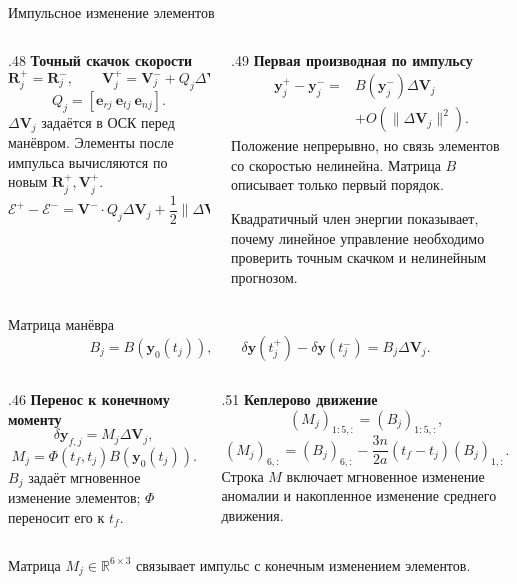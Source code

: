 \documentclass[11pt,aspectratio=169,t]{beamer}
\newcommand{\eqcompact}{\fontsize{10}{12}\selectfont}
\newcommand{\derivationmathspacing}{%
  \setlength{\abovedisplayskip}{2pt}%
  \setlength{\belowdisplayskip}{3pt}%
  \setlength{\abovedisplayshortskip}{2pt}%
  \setlength{\belowdisplayshortskip}{2pt}%
  \setlength{\jot}{2pt}}
\newcommand{\vect}[1]{\boldsymbol{#1}}
\begin{document}
\begin{frame}{Импульсное изменение элементов}
\relax
\derivationmathspacing
\begin{columns}[T,onlytextwidth]
\begin{column}{.48\textwidth}
\textbf{Точный скачок скорости}
{\eqcompact\derivationmathspacing
\[
 \vect R_j^+=\vect R_j^-,\qquad
 \vect V_j^+=\vect V_j^-+Q_j\Delta\vect V_j,
\]
\[
 Q_j=[\vect e_{rj}\ \vect e_{tj}\ \vect e_{nj}].
\]
}
$\Delta\vect V_j$ задаётся в ОСК перед манёвром. Элементы после импульса вычисляются по новым $\vect R_j^+,\vect V_j^+$.
{\eqcompact\derivationmathspacing
\[
 \mathcal E^+-\mathcal E^-
 =\vect V^-\cdot Q_j\Delta\vect V_j
       +\frac12\|\Delta\vect V_j\|^2.
\]
}
\end{column}
\begin{column}{.49\textwidth}
\textbf{Первая производная по импульсу}
{\eqcompact\derivationmathspacing
\[
 \begin{aligned}
 \vect y_j^+-\vect y_j^-={}&B(\vect y_j^-)\Delta\vect V_j\\
 &+O(\|\Delta\vect V_j\|^2).
 \end{aligned}
\]
}
Положение непрерывно, но связь элементов со скоростью нелинейна. Матрица $B$ описывает только первый порядок.
\par\smallskip
Квадратичный член энергии показывает, почему линейное управление необходимо проверить точным скачком и нелинейным прогнозом.
\end{column}
\end{columns}
\end{frame}

\begin{frame}{Матрица манёвра}
\relax
\derivationmathspacing
{\eqcompact\derivationmathspacing
\[
 B_j=B(\vect y_0(t_j)),\qquad
 \delta\vect y(t_j^+)-\delta\vect y(t_j^-)=B_j\Delta\vect V_j.
\]
}
\begin{columns}[T,onlytextwidth]
\begin{column}{.46\textwidth}
\textbf{Перенос к конечному моменту}
{\eqcompact\derivationmathspacing
\[
 \delta\vect y_{f,j}=M_j\Delta\vect V_j,
\]
\[
 \boxed{M_j=\Phi(t_f,t_j)B(\vect y_0(t_j)).}
\]
}
$B_j$ задаёт мгновенное изменение элементов; $\Phi$ переносит его к $t_f$.

\end{column}
\begin{column}{.51\textwidth}
\textbf{Кеплерово движение}
{\eqcompact\derivationmathspacing
\[
 (M_j)_{1:5,:}=(B_j)_{1:5,:},
\]
\[
 (M_j)_{6,:}=(B_j)_{6,:}
     -\frac{3n}{2a}(t_f-t_j)(B_j)_{1,:}.
\]
}
Строка $M$ включает мгновенное изменение аномалии и накопленное изменение среднего движения.

\end{column}
\end{columns}
Матрица $M_j\in\mathbb R^{6\times3}$ связывает импульс с конечным изменением элементов.
\end{frame}
\end{document}

